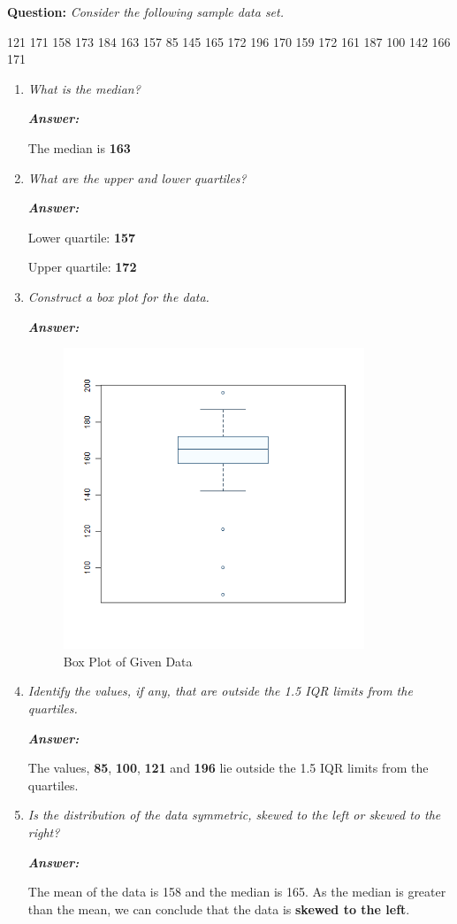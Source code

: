 \documentclass[12pt,letterpaper]{article}
\begin{document}
\textbf{Question:}
\textit{Consider the following sample data set.}
\begin{center}
  121 171 158 173 184 163 157 85 145 165 172 196 170 159 172 161 187 100 142 166 171
\end{center}

\begin{enumerate}[1.] \setlength{\itemsep}{30pt}
  \item \textit{What is the median?}
  
  \textbf{\textit{Answer: }}
  
  The median is \textbf{163}
  \item \textit{What are the upper and lower quartiles?}
  
  \textbf{\textit{Answer: }}

  Lower quartile: \textbf{157}

  Upper quartile: \textbf{172}
  \item \textit{Construct a box plot for the data.}
  
  \textbf{\textit{Answer: }}

  \begin{figure}[h]
    \centering
    \includegraphics[width=9cm]{box-plot.png}
    \caption{Box Plot of Given Data}
  \end{figure}
  \newpage
  \item \textit{Identify the values, if any, that are outside the 1.5 IQR limits from the quartiles.}
  
  \textbf{\textit{Answer: }}

  The values, \textbf{85}, \textbf{100}, \textbf{121} and \textbf{196} lie outside the 1.5 IQR limits from the quartiles.
  \item \textit{Is the distribution of the data symmetric, skewed to the left or skewed to the right?}
  
  \textbf{\textit{Answer: }}

  The mean of the data is 158 and the median is 165.
  As the median is greater than the mean, we can conclude that the data is \textbf{skewed to the left}.
\end{enumerate}
\end{document}
